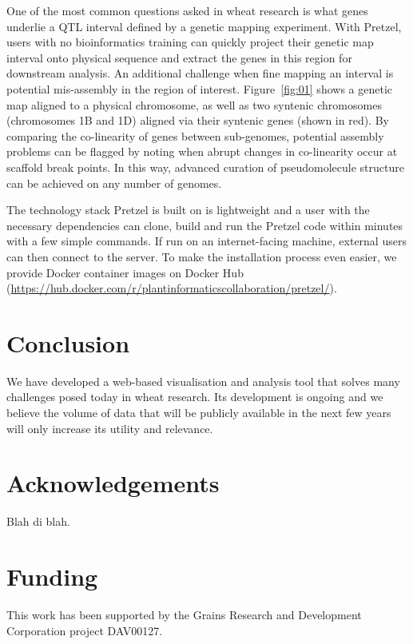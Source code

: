 \documentclass{bioinfo}
\begin{document}
\begin{methods}
One of the most common questions asked in wheat research is what genes underlie a QTL interval
  defined by a genetic mapping experiment. 
%
With Pretzel, users with no bioinformatics training can quickly project their genetic map interval
  onto physical sequence and extract the genes in this region for downstream analysis. 
%
An additional challenge when fine mapping an interval is potential mis-assembly in the region
  of interest. Figure~\ref{fig:01} shows a genetic map aligned to a physical chromosome, as well as
  two syntenic chromosomes (chromosomes 1B and 1D) aligned via their syntenic genes (shown in red). 
%
By comparing the co-linearity of genes between sub-genomes, potential assembly problems can be
  flagged by noting when abrupt changes in co-linearity occur at scaffold break points. 
%
In this way, advanced curation of pseudomolecule structure can be achieved on any number of genomes.

The technology stack Pretzel is built on is lightweight and a user with the necessary dependencies
can clone, build and run the Pretzel code within minutes with a few simple commands. 
%
If run on an internet-facing machine, external users can then connect to the server.
%
To make the installation process even easier, we provide Docker container images on Docker Hub
(\href{https://hub.docker.com/r/plantinformaticscollaboration/pretzel/}{https://hub.docker.com/r/plantinformaticscollaboration/pretzel/}).
\end{methods}

\section{Conclusion}

We have developed a web-based visualisation and analysis tool that solves many challenges posed today in wheat research. 
%
Its development is ongoing and we believe the volume of data that will be publicly available in the next few years will only increase its utility and relevance.

\section*{Acknowledgements}

Blah di blah.

\section*{Funding}

This work has been supported by the Grains Research and Development Corporation project DAV00127.\vspace*{-12pt}




\end{document}
